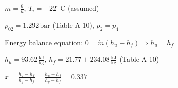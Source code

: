 \( \dot{m} = \frac{6}{h} \), \( T_i = -22^\circ \, \text{C} \) (assumed)  

\( p_02 = 1.292 \, \text{bar} \) (Table A-10), \( p_2 = p_4 \)  

Energy balance equation:  
\( 0 = \dot{m} (h_u - h_f) \Rightarrow h_u = h_f \)  

\( h_u = 93.62 \, \frac{\text{kJ}}{\text{kg}} \), \( h_f = 21.77 + 234.08 \, \frac{\text{kJ}}{\text{kg}} \) (Table A-10)  

\( x = \frac{h_u - h_f}{h_g - h_f} = \frac{h_u - h_f}{h_g - h_f} = 0.337 \)